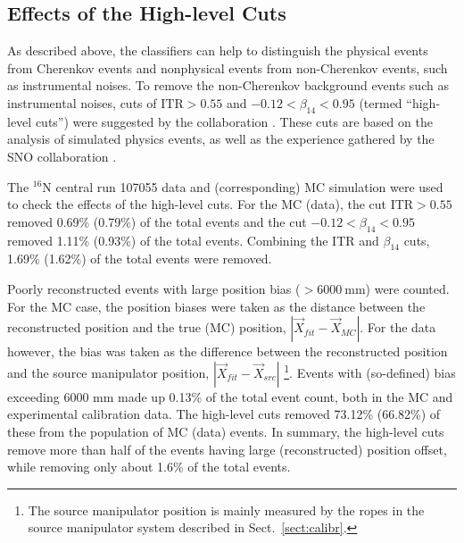\subsection{Effects of the High-level Cuts}

As described above, the classifiers can help to distinguish the physical events from Cherenkov events and nonphysical events from non-Cherenkov events, such as instrumental noises. To remove the non-Cherenkov background events such as instrumental noises, cuts of $\mathrm{ITR}>0.55$ and $-0.12<\beta_{14}<0.95$ (termed ``high-level cuts'') were suggested by the collaboration \cite{waterunidoc}. These cuts are based on the analysis of simulated physics events, as well as the experience gathered by the SNO collaboration \cite{waterunidoc,marzec2019measurement,dunmore2004separation}. %

The $^{16}$N central run 107055 data and (corresponding) MC simulation were used to check the effects of the high-level cuts. For the MC (data), the cut ITR$>0.55$ removed 0.69\% (0.79\%) of the total events and the cut $-0.12<\beta_{14}<0.95$ removed 1.11\% (0.93\%) of the total events. Combining the ITR and $\beta_{14}$ cuts, 1.69\% (1.62\%) of the total events were removed.

Poorly reconstructed events with large position bias ($>6000~$mm) were counted. For the MC case, the position biases were taken as the distance between the reconstructed position and the true (MC) position, $|\vec{X}_{fit}-\vec{X}_{MC}|$. For the data however, the bias was taken as the difference between the reconstructed position and the source manipulator position, $|\vec{X}_{fit}-\vec{X}_{src}|$ \footnote{The source manipulator position is mainly measured by the ropes in the source manipulator system described in Sect.~\ref{sect:calibr}.}. Events with (so-defined) bias exceeding 6000 mm made up 0.13\% of the total event count, both in the MC and experimental calibration data. The high-level cuts removed 73.12\% (66.82\%) of these from the population of MC (data) events. In summary, the high-level cuts remove more than half of the events having large (reconstructed) position offset, while removing only about 1.6\% of the total events. 


